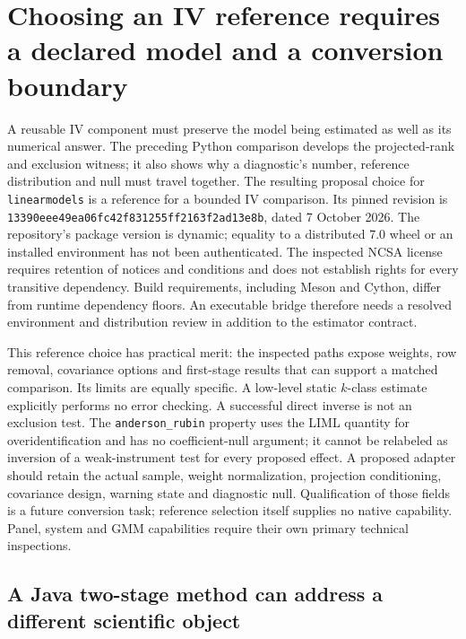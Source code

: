 \section{Choosing an IV reference requires a declared model and a conversion boundary}
\label{exec23:iv-choice}

A reusable IV component must preserve the model being estimated as well as its
numerical answer. The preceding Python comparison develops the projected-rank
and exclusion witness; it also shows why a diagnostic's number, reference
distribution and null must travel together. The resulting proposal choice for
\texttt{linearmodels} is a reference for a bounded IV comparison. Its pinned
revision is \texttt{13390eee49ea06fc42f831255ff2163f2ad13e8b}, dated
7 October 2026. The repository's package version is dynamic; equality to a
distributed 7.0 wheel or an installed environment has not been authenticated.
The inspected NCSA license requires retention of notices and conditions and
does not establish rights for every transitive dependency. Build requirements,
including Meson and Cython, differ from runtime dependency floors. An executable
bridge therefore needs a resolved environment and distribution review in
addition to the estimator contract.\citep{exec22_linearmodels_reuse}

This reference choice has practical merit: the inspected paths expose weights,
row removal, covariance options and first-stage results that can support a
matched comparison. Its limits are equally specific. A low-level static
$k$-class estimate explicitly performs no error checking. A successful direct
inverse is not an exclusion test. The \texttt{anderson\_rubin} property uses
the LIML quantity for overidentification and has no coefficient-null argument;
it cannot be relabeled as inversion of a weak-instrument test for every
proposed effect. A proposed adapter should retain the actual sample, weight
normalization, projection conditioning, covariance design, warning state and
diagnostic null. Qualification of those fields is a future conversion task;
reference selection itself supplies no native capability. Panel, system and
GMM capabilities require their own primary technical inspections.
\citep{exec22_linearmodels_reuse}

\subsection{A Java two-stage method can address a different scientific object}
\label{exec23:iv-java}

